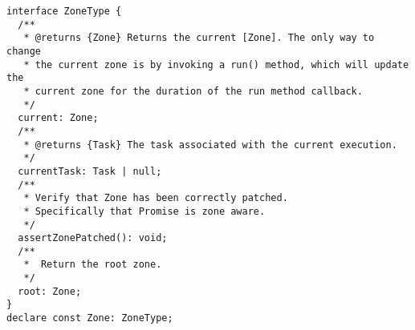 \begin{verbatim}
interface ZoneType {
  /**
   * @returns {Zone} Returns the current [Zone]. The only way to change
   * the current zone is by invoking a run() method, which will update the
   * current zone for the duration of the run method callback.
   */
  current: Zone;
  /**
   * @returns {Task} The task associated with the current execution.
   */
  currentTask: Task | null;
  /**
   * Verify that Zone has been correctly patched.
   * Specifically that Promise is zone aware.
   */
  assertZonePatched(): void;
  /**
   *  Return the root zone.
   */
  root: Zone;
}
declare const Zone: ZoneType;
\end{verbatim}
